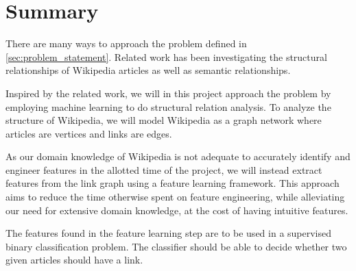 \section{Summary}
There are many ways to approach the problem defined in \cref{sec:problem_statement}. Related work has been investigating the structural relationships of Wikipedia articles as well as semantic relationships.

Inspired by the related work, we will in this project approach the problem by employing machine learning to do structural relation analysis. To analyze the structure of Wikipedia, we will model Wikipedia as a graph network where articles are vertices and links are edges.

As our domain knowledge of Wikipedia is not adequate to accurately identify and engineer features in the allotted time of the project, we will instead extract features from the link graph using a feature learning framework. This approach aims to reduce the time otherwise spent on feature engineering, while alleviating our need for extensive domain knowledge, at the cost of having intuitive features.

The features found in the feature learning step are to be used in a supervised binary classification problem. The classifier should be able to decide whether two given articles should have a link.






